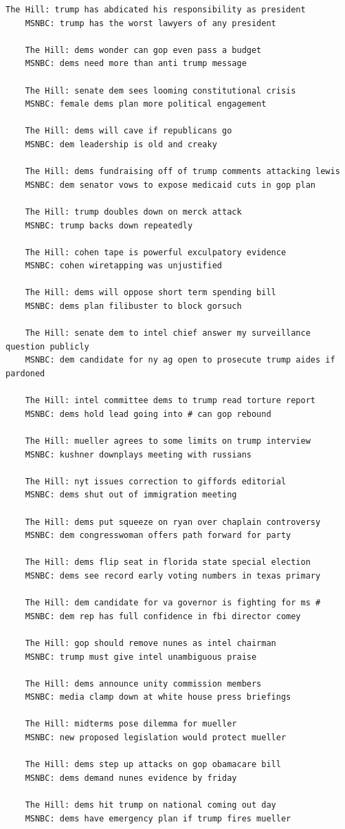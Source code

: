 \documentclass{scrartcl}
\begin{document}
\begin{lstlisting}[basicstyle=\tiny\hlfont]
    The Hill: trump has abdicated his responsibility as president
    MSNBC: trump has the worst lawyers of any president

    The Hill: dems wonder can gop even pass a budget
    MSNBC: dems need more than anti trump message

    The Hill: senate dem sees looming constitutional crisis
    MSNBC: female dems plan more political engagement

    The Hill: dems will cave if republicans go
    MSNBC: dem leadership is old and creaky

    The Hill: dems fundraising off of trump comments attacking lewis
    MSNBC: dem senator vows to expose medicaid cuts in gop plan

    The Hill: trump doubles down on merck attack
    MSNBC: trump backs down repeatedly

    The Hill: cohen tape is powerful exculpatory evidence
    MSNBC: cohen wiretapping was unjustified

    The Hill: dems will oppose short term spending bill
    MSNBC: dems plan filibuster to block gorsuch

    The Hill: senate dem to intel chief answer my surveillance question publicly
    MSNBC: dem candidate for ny ag open to prosecute trump aides if pardoned

    The Hill: intel committee dems to trump read torture report
    MSNBC: dems hold lead going into # can gop rebound

    The Hill: mueller agrees to some limits on trump interview
    MSNBC: kushner downplays meeting with russians

    The Hill: nyt issues correction to giffords editorial
    MSNBC: dems shut out of immigration meeting

    The Hill: dems put squeeze on ryan over chaplain controversy
    MSNBC: dem congresswoman offers path forward for party

    The Hill: dems flip seat in florida state special election
    MSNBC: dems see record early voting numbers in texas primary

    The Hill: dem candidate for va governor is fighting for ms #
    MSNBC: dem rep has full confidence in fbi director comey

    The Hill: gop should remove nunes as intel chairman
    MSNBC: trump must give intel unambiguous praise

    The Hill: dems announce unity commission members
    MSNBC: media clamp down at white house press briefings

    The Hill: midterms pose dilemma for mueller
    MSNBC: new proposed legislation would protect mueller

    The Hill: dems step up attacks on gop obamacare bill
    MSNBC: dems demand nunes evidence by friday

    The Hill: dems hit trump on national coming out day
    MSNBC: dems have emergency plan if trump fires mueller
\end{lstlisting}
\end{document}
